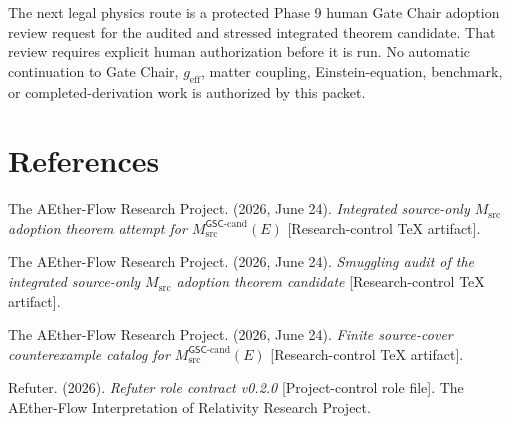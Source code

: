 \documentclass[11pt]{article}
\begin{document}
The next legal physics route is a protected Phase 9 human Gate Chair adoption
review request for the audited and stressed integrated theorem candidate. That
review requires explicit human authorization before it is run. No automatic
continuation to Gate Chair, \(g_{\mathrm{eff}}\), matter coupling,
Einstein-equation, benchmark, or completed-derivation work is authorized by
this packet.

\section*{References}

The AEther-Flow Research Project. (2026, June 24). \textit{Integrated
source-only \(M_{\mathrm{src}}\) adoption theorem attempt for
\(M_{\mathrm{src}}^{\mathsf{GSC}\mbox{-}\mathrm{cand}}(E)\)}
[Research-control TeX artifact].

The AEther-Flow Research Project. (2026, June 24). \textit{Smuggling audit of
the integrated source-only \(M_{\mathrm{src}}\) adoption theorem candidate}
[Research-control TeX artifact].

The AEther-Flow Research Project. (2026, June 24). \textit{Finite source-cover
counterexample catalog for
\(M_{\mathrm{src}}^{\mathsf{GSC}\mbox{-}\mathrm{cand}}(E)\)}
[Research-control TeX artifact].

Refuter. (2026). \textit{Refuter role contract v0.2.0}
[Project-control role file]. The AEther-Flow Interpretation of Relativity
Research Project.
\end{document}
